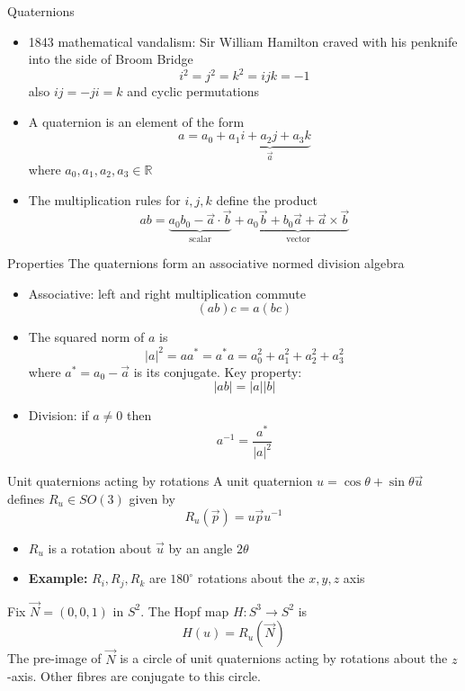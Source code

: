 \documentclass{beamer}
\newcommand{\R}{\mathbb{R}}
\newcommand{\va}{\vec{a}}
\newcommand{\vb}{\vec{b}}
\newcommand{\vu}{\vec{u}}
\newcommand{\vp}{\vec{p}}
\begin{document}
\begin{frame}{Quaternions}
	\begin{itemize}
		\item 1843 mathematical vandalism: Sir William Hamilton craved with his penknife into the side of Broom Bridge
		\[
		i^2 = j^2 = k^2 = ijk = -1
		\]
		also \(ij = -ji = k\) and cyclic permutations
		\item A quaternion is an element of the form 
		\[
		a = a_0 + \underbrace{a_1 i + a_2 j + a_3 k}_{\va}
		\]
		where \(a_0, a_1, a_2, a_3 \in \R\)
		\item The multiplication rules for \(i, j, k\) define the product
		\[
		a b = \underbrace{a_0 b_0 - \va \cdot \vb}_{\text{scalar}} + \underbrace{a_0 \vb + b_0 \va + \va \times \vb}_{\text{vector}}
		\]
	\end{itemize}
\end{frame}

\begin{frame}{Properties}
	The quaternions form an associative normed division algebra 
	\begin{itemize}
		\item Associative: left and right multiplication commute
		\[
		(ab)c = a(bc)
		\]
		\item The squared norm of \(a\) is
		\[
		|a|^2 = a a^* = a^* a = a_0^2 + a_1^2 + a_2^2 + a_3^2 
		\]
		where \(a^* = a_0 - \va\) is its conjugate. Key property:
		\[
		| ab | = |a| |b|
		\] 
		\item Division: if \(a \neq 0\) then
		\[
		a^{-1} = \frac{a^*}{|a|^2}
		\]
	\end{itemize}	
\end{frame}

\begin{frame}{Unit quaternions acting by rotations}
	A unit quaternion \(u = \cos \theta + \sin \theta \vu \) defines \(R_u \in SO(3)\) given by
	\[
	R_u (\vp) = u \vp u^{-1}
	\]
	\begin{itemize}
		\item \(R_u\) is a rotation about \(\vu\) by an angle \(2 \theta\)
		\item \textbf{Example:} \(R_i, R_j, R_k\) are \(180^{\circ}\) rotations about the \(x, y, z\) axis
	\end{itemize}
	Fix \(\vec{N} = (0,0,1)\) in \(S^2\). The Hopf map \(H:S^3 \to S^2\) is
	\[
	H(u) = R_u(\vec{N})
	\]
	The pre-image of \(\vec{N}\) is a circle of unit quaternions acting by rotations about the \(z\)-axis. Other fibres are conjugate to this circle.
\end{frame}
\end{document}

